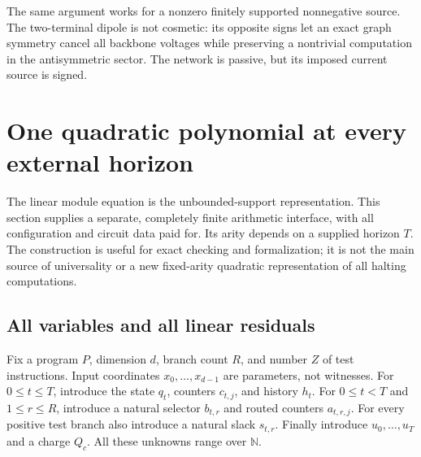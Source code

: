 \documentclass[11pt,letterpaper]{article}
\theoremstyle{definition}
\theoremstyle{remark}
\newcommand{\N}{\mathbb N}
\begin{document}
The same argument works for a nonzero finitely supported nonnegative
source. The two-terminal dipole is not cosmetic: its opposite signs let
an exact graph symmetry cancel all backbone voltages while preserving
a nontrivial computation in the antisymmetric sector. The network is
passive, but its imposed current source is signed.

\section{One quadratic polynomial at every external horizon}
\label{ste:wc:sec:quadratic}

The linear module equation is the unbounded-support representation. This
section supplies a separate, completely finite arithmetic interface, with
all configuration and circuit data paid for. Its arity depends on a supplied
horizon $T$. The construction is useful for exact checking and formalization;
it is not the main source of universality or a new fixed-arity quadratic
representation of all halting computations.

\subsection{All variables and all linear residuals}
Fix a program $P$, dimension $d$, branch count $R$, and number $Z$ of test
instructions. Input coordinates $x_0,\ldots,x_{d-1}$ are parameters, not
witnesses. For $0\leq t\leq T$, introduce the state $q_t$, counters
$c_{t,j}$, and history $h_t$. For $0\leq t<T$ and $1\leq r\leq R$,
introduce a natural selector $b_{t,r}$ and routed counters $a_{t,r,j}$.
For every positive test branch also introduce a natural slack $s_{t,r}$.
Finally introduce $u_0,\ldots,u_T$ and a charge $Q_c$. All these unknowns
range over $\N$.
\end{document}
